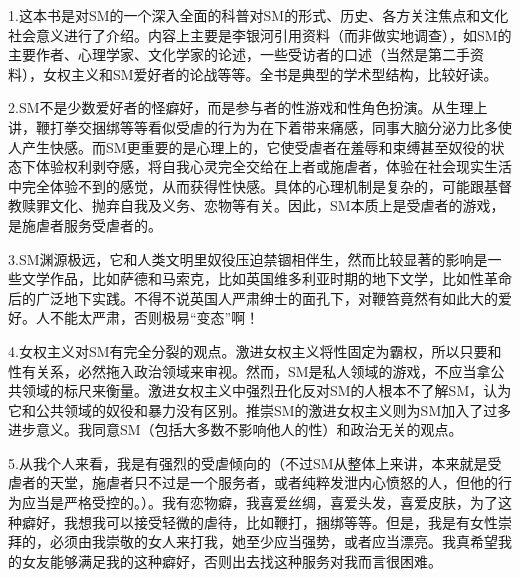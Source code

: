 1.这本书是对SM的一个深入全面的科普对SM的形式、历史、各方关注焦点和文化社会意义进行了介绍。内容上主要是李银河引用资料（而非做实地调查），如SM的主要作者、心理学家、文化学家的论述，一些受访者的口述（当然是第二手资料），女权主义和SM爱好者的论战等等。全书是典型的学术型结构，比较好读。

2.SM不是少数爱好者的怪癖好，而是参与者的性游戏和性角色扮演。从生理上讲，鞭打拳交捆绑等等看似受虐的行为为在下着带来痛感，同事大脑分泌力比多使人产生快感。而SM更重要的是心理上的，它使受虐者在羞辱和束缚甚至奴役的状态下体验权利剥夺感，将自我心灵完全交给在上者或施虐者，体验在社会现实生活中完全体验不到的感觉，从而获得性快感。具体的心理机制是复杂的，可能跟基督教赎罪文化、抛弃自我及义务、恋物等有关。因此，SM本质上是受虐者的游戏，是施虐者服务受虐者的。

3.SM渊源极远，它和人类文明里奴役压迫禁锢相伴生，然而比较显著的影响是一些文学作品，比如萨德和马索克，比如英国维多利亚时期的地下文学，比如性革命后的广泛地下实践。不得不说英国人严肃绅士的面孔下，对鞭笞竟然有如此大的爱好。人不能太严肃，否则极易“变态”啊！

4.女权主义对SM有完全分裂的观点。激进女权主义将性固定为霸权，所以只要和性有关系，必然拖入政治领域来审视。然而，SM是私人领域的游戏，不应当拿公共领域的标尺来衡量。激进女权主义中强烈丑化反对SM的人根本不了解SM，认为它和公共领域的奴役和暴力没有区别。推崇SM的激进女权主义则为SM加入了过多进步意义。我同意SM（包括大多数不影响他人的性）和政治无关的观点。

5.从我个人来看，我是有强烈的受虐倾向的（不过SM从整体上来讲，本来就是受虐者的天堂，施虐者只不过是一个服务者，或者纯粹发泄内心愤怒的人，但他的行为应当是严格受控的。）。我有恋物癖，我喜爱丝绸，喜爱头发，喜爱皮肤，为了这种癖好，我想我可以接受轻微的虐待，比如鞭打，捆绑等等。但是，我是有女性崇拜的，必须由我崇敬的女人来打我，她至少应当强势，或者应当漂亮。我真希望我的女友能够满足我的这种癖好，否则出去找这种服务对我而言很困难。